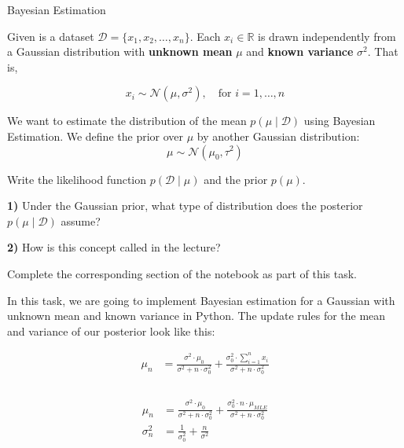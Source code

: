 \documentclass[
	english,
        solution=true
	]{tudaexercise}
\begin{document}
\begin{task}[points=16]{Bayesian Estimation}

Given is a dataset \( \mathcal{D} = \{x_1, x_2, \dots, x_n\} \). Each \( x_i \in \mathbb{R} \) is drawn independently from a Gaussian distribution with \textbf{unknown mean} \( \mu \) and \textbf{known variance} \( \sigma^2 \). That is,

\[
x_i \sim \mathcal{N}(\mu, \sigma^2), \quad \text{for } i = 1, \dots, n
\]

We want to estimate the distribution of the mean $ p(\mu \mid \mathcal{D}) $ using Bayesian Estimation. We define the prior over $\mu$ by another Gaussian distribution:
\[
\mu \sim \mathcal{N}(\mu_0, \tau^2)
\]
\begin{subtask}[points=2]{}
    Write the likelihood function $p(\mathcal{D} \mid \mu)$ and the prior $p(\mu)$.
\end{subtask}

\begin{solution}

\end{solution}

\begin{subtask}[points=2]


\textbf{1)} Under the Gaussian prior, what type of distribution does the posterior $ p(\mu \mid \mathcal{D})$ assume? 

\textbf{2)} How is this concept called in the lecture?
\end{subtask}

\begin{solution}

\end{solution}

\begin{subtask}[points=12]

\begin{programmingtaskbox}
Complete the corresponding section of the notebook as part of this task.
\end{programmingtaskbox}
    In this task, we are going to implement Bayesian estimation for a Gaussian with unknown mean and known variance in Python. The update rules for the mean and variance of our posterior look like this:

    \begin{align}
        \mu_{n} &= \frac{\sigma^{2} \cdot \mu_{0}}{\sigma^{2}+n\cdot\sigma_{0}^{2}} + \frac{\sigma_{0}^{2}\cdot \sum_{i=1}^{n} x_i}{\sigma^{2}+n\cdot\sigma_{0}^{2}}\\
    \end{align}
        \\
    \begin{align}
        \mu_{n} &= \frac{\sigma^{2} \cdot \mu_{0}}{\sigma^{2}+n\cdot\sigma_{0}^{2}} + \frac{\sigma_{0}^{2}\cdot n \cdot \mu_{MLE}}{\sigma^{2}+n\cdot\sigma_{0}^{2}}\\
        \sigma_{n}^{2} &= \frac{1}{\sigma_{0}^{2}} + \frac{n}{\sigma^{2}} 
    \end{align}


\end{subtask}
\end{task}
\end{document}
